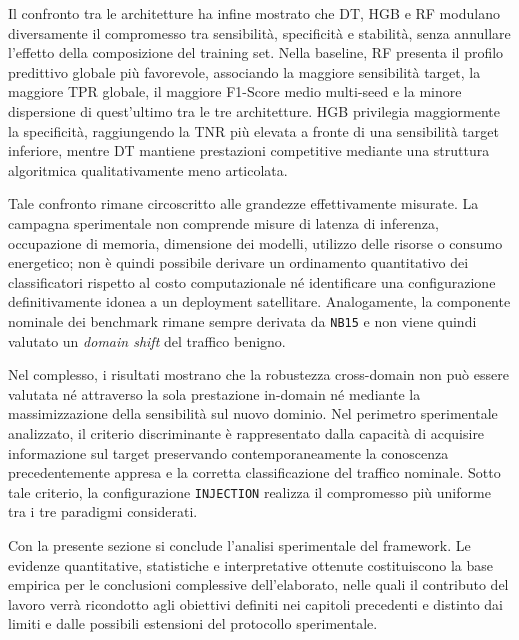 Il confronto tra le architetture ha infine mostrato che DT, HGB e RF modulano diversamente il compromesso tra sensibilità, specificità e stabilità, senza annullare l'effetto della composizione del training set.
Nella baseline, RF presenta il profilo predittivo globale più favorevole, associando la maggiore sensibilità target, la maggiore TPR globale, il maggiore F1-Score medio multi-seed e la minore dispersione di quest'ultimo tra le tre architetture. 
HGB privilegia maggiormente la specificità, raggiungendo la TNR più elevata a fronte di una sensibilità target inferiore, mentre DT mantiene prestazioni competitive mediante una struttura algoritmica qualitativamente meno articolata.

Tale confronto rimane circoscritto alle grandezze effettivamente misurate.
La campagna sperimentale non comprende misure di latenza di inferenza, occupazione di memoria, dimensione dei modelli, utilizzo delle risorse o consumo energetico; non è quindi possibile derivare un ordinamento quantitativo dei classificatori rispetto al costo computazionale né identificare una configurazione definitivamente idonea a un deployment satellitare. 
Analogamente, la componente nominale dei benchmark rimane sempre derivata da \texttt{NB15} e non viene quindi valutato un \textit{domain shift} del traffico benigno.

Nel complesso, i risultati mostrano che la robustezza cross-domain non può essere valutata né attraverso la sola prestazione in-domain né mediante la massimizzazione della sensibilità sul nuovo dominio. 
Nel perimetro sperimentale analizzato, il criterio discriminante è rappresentato dalla capacità di acquisire informazione sul target preservando contemporaneamente la conoscenza precedentemente appresa e la corretta classificazione del traffico nominale. 
Sotto tale criterio, la configurazione \texttt{INJECTION} realizza il compromesso più uniforme tra i tre paradigmi considerati.

Con la presente sezione si conclude l'analisi sperimentale del framework.
Le evidenze quantitative, statistiche e interpretative ottenute costituiscono la base empirica per le conclusioni complessive dell'elaborato, nelle quali il contributo del lavoro verrà ricondotto agli obiettivi definiti nei capitoli precedenti e distinto dai limiti e dalle possibili estensioni del protocollo sperimentale.
